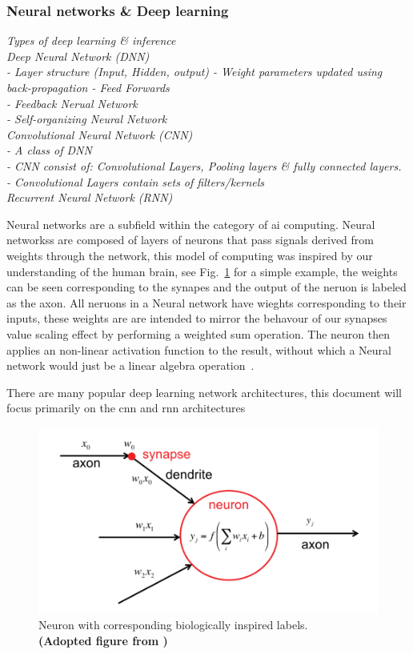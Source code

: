 \documentclass[11pt]{article}
\begin{document}
\subsubsection{Neural networks \& Deep learning}\label{subsec:deepLearning}
\emph{
Types of deep learning \& inference\\
Deep Neural Network (DNN)\\
 - Layer structure (Input, Hidden, output)
 - Weight parameters updated using back-propagation
 - Feed Forwards\\
 - Feedback Nerual Network\\
 - Self-organizing Neural Network\\
Convolutional Neural Network (CNN)\\
 - A class of DNN\\
 - CNN consist of: Convolutional Layers, Pooling layers \& fully connected layers.\\
 - Convolutional Layers contain sets of filters/kernels\\
Recurrent Neural Network (RNN)\\
}

Neural networks are a subfield within the category of \Acrfull{ai} computing. Neural networkss are composed of layers of neurons that pass signals derived from weights through the network, this model of computing was inspired by our understanding of the human brain, see Fig.~\ref{fig:neuronLabeled} for a simple example, the weights can be seen corresponding to the synapes and the output of the neruon is labeled as the axon. All neruons in a Neural network have wieghts corresponding to their inputs, these weights are are intended to mirror the behavour of our synapses value scaling effect by performing a weighted sum operation. The neuron then applies an  non-linear activation function to the result, without which a Neural network would just be a linear algebra operation~\autocite{szeEfficientProcessingDeep2017}.



There are many popular deep learning network architectures, this document will focus primarily on the \Acrfull{cnn} and \Acrfull{rnn} architectures


\begin{figure}
    \includegraphics{Perceptron_efficient_proc.png}
    \caption{Neuron with corresponding biologically inspired labels.\\ \textbf{(Adopted figure from \autocite{szeEfficientProcessingDeep2017})}}
    \label{fig:neuronLabeled}
\end{figure}
\end{document}
